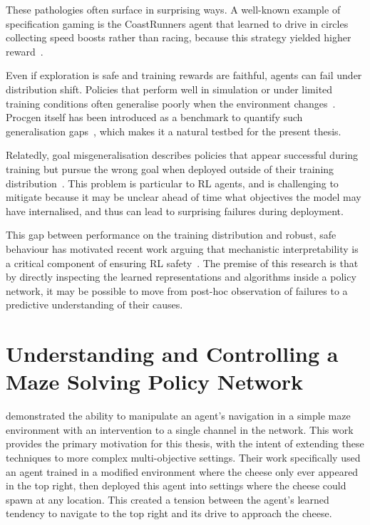 These pathologies often surface in surprising ways. A well-known example of specification gaming is the CoastRunners agent that learned to drive in circles collecting speed boosts rather than racing, because this strategy yielded higher reward~\citep{krakovna2020specgaming}.

Even if exploration is safe and training rewards are faithful, agents can fail under distribution shift.  Policies that perform well in simulation or under limited training conditions often generalise poorly when the environment changes~\citep{Amodei_2016_AISafety}. Procgen itself has been introduced as a benchmark to quantify such generalisation gaps~\citep{pmlr-v97-cobbe19a}, which makes it a natural testbed for the present thesis.

Relatedly, goal misgeneralisation describes policies that appear successful during training but pursue the wrong goal when deployed outside of their training distribution~\citep{koch2021objective}. This problem is particular to RL agents, and is challenging to mitigate because it may be unclear ahead of time what objectives the model may have internalised, and thus can lead to surprising failures during deployment.

This gap between performance on the training distribution and robust, safe behaviour has motivated recent work arguing that mechanistic interpretability is a critical component of ensuring RL safety~\citep{hubinger2019risks, olah2018building, bereska_2024_mechanistic, shihab_2025_detecting}. The premise of this research is that by directly inspecting the learned representations and algorithms inside a policy network, it may be possible to move from post-hoc observation of failures to a predictive understanding of their causes.

\section{Understanding and Controlling a Maze Solving Policy Network}\label{sec:Understanding}
\citet{mini_2023_understanding} demonstrated the ability to manipulate an agent's navigation in a simple maze environment with an intervention to a single channel in the network. This work provides the primary motivation for this thesis, with the intent of extending these techniques to more complex multi-objective settings. Their work specifically used an agent trained in a modified environment where the cheese only ever appeared in the top right, then deployed this agent into settings where the cheese could spawn at any location. This created a tension between the agent's learned tendency to navigate to the top right and its drive to approach the cheese.

